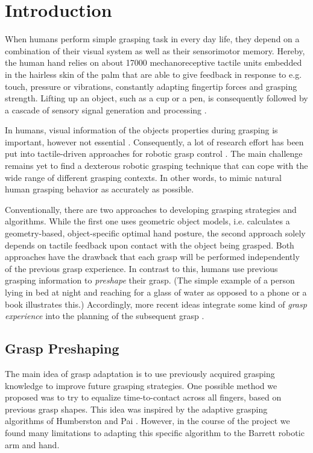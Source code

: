 \renewcommand{\thesection}{\Roman{section}}
\thispagestyle{empty}
\section{Introduction}
\quad When humans perform simple grasping task in every day life, they depend on a combination of their visual system as well as their sensorimotor memory. Hereby, the human hand relies on about 17000 mechanoreceptive tactile units \cite{SkinTouch} embedded in the hairless skin of the palm that are able to give feedback in response to e.g. touch, pressure or vibrations, constantly adapting fingertip forces and grasping strength. Lifting up an object, such as a cup or a pen, is consequently followed by a cascade of sensory signal generation and processing \cite{TortaGerardJ.2011}. 

In humans, visual information of the objects properties during grasping is important, however not essential \cite{VisualSensory}. Consequently, a lot of research effort has been put into tactile-driven approaches for robotic grasp control \cite{LeeNicholls} \cite{Yousef1}. The main challenge remains yet to find a dexterous robotic grasping technique that can cope with the wide range of different grasping contexts. In other words, to mimic natural human grasping behavior as accurately as possible. 

Conventionally, there are two approaches to developing grasping strategies and algorithms. While the first one uses geometric object models, i.e. calculates a geometry-based, object-specific optimal hand posture, the second approach solely depends on tactile feedback upon contact with the object being grasped. Both approaches have the drawback that each grasp will be performed independently of the previous grasp experience. In contrast to this, humans use previous grasping information to \emph{preshape} their grasp. (The simple example of a person lying in bed at night and reaching for a glass of water as opposed to a phone or a book illustrates this.) Accordingly, more recent ideas integrate some kind of \emph{grasp experience} into the planning of the subsequent grasp \cite{Steffen}\cite{Pastor}. 

\subsection*{Grasp Preshaping}
The main idea of grasp adaptation is to use previously acquired grasping knowledge to improve future grasping strategies. One possible method we proposed was to try to equalize time-to-contact across all fingers, based on previous grasp shapes. This idea was inspired by the adaptive grasping algorithms of Humberston and Pai \cite{Ben}. However, in the course of the project we found many limitations to adapting this specific algorithm to the Barrett robotic arm and hand.

